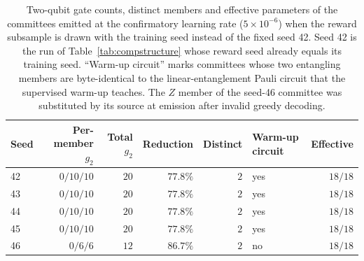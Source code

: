 \begin{table}[t]
\centering
\caption{Two-qubit gate counts, distinct members and effective parameters of the committees
emitted at the confirmatory learning rate ($5\times10^{-6}$) when the reward subsample
is drawn with the training seed instead of the fixed seed 42. Seed 42 is the run of
Table~\ref{tab:compstructure} whose reward seed already equals its training seed.
``Warm-up circuit'' marks committees whose two entangling members are byte-identical to
the linear-entanglement Pauli circuit that the supervised warm-up teaches. The $Z$ member
of the seed-46 committee was substituted by its source at emission after invalid greedy
decoding.}
\label{tab:s3structure}
\begin{tabular}{@{}lrrrrlr@{}}
\toprule
Seed & Per-member $g_2$ & Total $g_2$ & Reduction & Distinct & Warm-up circuit & Effective \\
\midrule
42 & $0/10/10$ & $20$ & $77.8\%$ & $2$ & yes & $18/18$ \\
43 & $0/10/10$ & $20$ & $77.8\%$ & $2$ & yes & $18/18$ \\
44 & $0/10/10$ & $20$ & $77.8\%$ & $2$ & yes & $18/18$ \\
45 & $0/10/10$ & $20$ & $77.8\%$ & $2$ & yes & $18/18$ \\
46 & $0/6/6$ & $12$ & $86.7\%$ & $2$ & no & $18/18$ \\
\bottomrule
\end{tabular}
\end{table}
